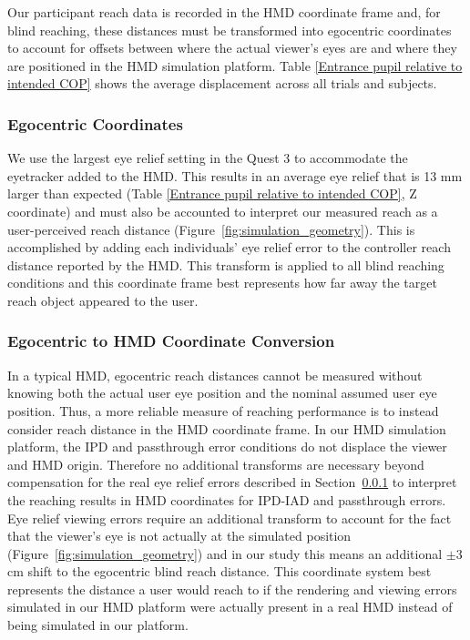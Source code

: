 \documentclass[acmlarge, nonacm]{acmart}
\begin{document}
 Our participant reach data is recorded in the HMD coordinate frame and, for blind reaching, these distances must be transformed into egocentric coordinates to account for offsets between where the actual viewer's eyes are and where they are positioned in the HMD simulation platform. Table \ref{Entrance pupil relative to intended COP} shows the average displacement across all trials and subjects.


 \subsubsection{Egocentric Coordinates} \label{sec:ego_blind}

 We use the largest eye relief setting in the Quest 3 to accommodate the eyetracker added to the HMD. This results in an average eye relief that is 13 mm larger than expected (Table \ref{Entrance pupil relative to intended COP}, Z coordinate) and must also be accounted to interpret our measured reach as a user-perceived reach distance (Figure~\ref{fig:simulation_geometry}). This is accomplished by adding each individuals' eye relief error to the controller reach distance reported by the HMD. This transform is applied to all blind reaching conditions and this coordinate frame best represents how far away the target reach object appeared to the user.

 \subsubsection{Egocentric to HMD Coordinate Conversion} \label{sec:simulated_user_coords}

 In a typical HMD, egocentric reach distances cannot be measured without knowing both the actual user eye position and the nominal assumed user eye position. Thus, a more reliable measure of reaching performance is to instead consider reach distance in the HMD coordinate frame. In our HMD simulation platform, the IPD and passthrough error conditions do not displace the viewer and HMD origin. Therefore no additional transforms are necessary beyond compensation for the real eye relief errors described in Section~\ref{sec:ego_blind} to interpret the reaching results in HMD coordinates for IPD-IAD and passthrough errors. Eye relief viewing errors require an additional transform to account for the fact that the viewer's eye is not actually at the simulated position (Figure~\ref{fig:simulation_geometry}) and in our study this means an additional $\pm$3 cm shift to the egocentric blind reach distance. This coordinate system best represents the distance a user would reach to if the rendering and viewing errors simulated in our HMD platform were actually present in a real HMD instead of being simulated in our platform.
\end{document}
